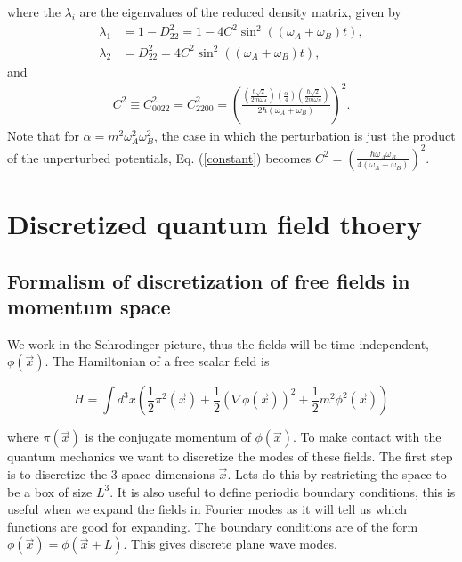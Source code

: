 \documentclass[aps,showpacs,onecolumn,floats,prd,superscriptaddress,nofootinbib]{revtex4-1}
\begin{document}
where the $\lambda_i$ are the eigenvalues of the reduced density matrix, given by
\begin{align}
\lambda_1 &= 1 - D_{22}^2 = 1 - 4C^2 \sin^2{((\omega_A + \omega_B)t)}, \label{eig1}
\\ \lambda_2 &= D_{22}^2 = 4C^2 \sin^2{((\omega_A + \omega_B)t)}, \label{eig2}
\end{align}
and 
\begin{align}
C^2 \equiv C_{0022}^2 =  C_{2200}^2 = \left(\frac{\left( \frac{\hbar\sqrt{2}}{2m\omega_A}\right) \left( \frac{\alpha}{4}\right) \left( \frac{\hbar\sqrt{2}}{2m\omega_B}\right)}{2\hbar (\omega_A + \omega_B)}\right)^2. \label{constant}
\end{align}
Note that for $\alpha = m^2 \omega_A^2\omega_B^2$, the case in which the perturbation is just the product of the unperturbed potentials, Eq. (\ref{constant}) becomes $C^2 =  \left( \frac{\hbar \omega_A\omega_B}{4(\omega_A + \omega_B)} \right)^2$. 

\section{Discretized quantum field thoery} \label{sec:QFTflat}

\subsection{Formalism of discretization of free fields in momentum space}

We work in the Schrodinger picture, thus the fields will be time-independent, $\phi(\vec{x})$. 
The Hamiltonian of a free scalar field is

\begin{equation}
	H = \int d^3x \left( \frac{1}{2} \pi^2(\vec{x}) + \frac{1}{2} (\nabla \phi(\vec{x}))^2 + \frac{1}{2} m^2 \phi^2(\vec{x}) \right)	\label{free-scalar hamiltonian}
\end{equation}

where $\pi(\vec{x})$ is the conjugate momentum of $\phi(\vec{x})$. 
To make contact with the quantum mechanics we want to discretize the modes of these fields. 
The first step is to discretize the 3 space dimensions $\vec{x}$.
Lets do this by restricting the space to be a box of size $L^3$. 
It is also useful to define periodic boundary conditions, this is useful when we expand the fields in Fourier modes as it will tell us which functions are good for expanding. 
The boundary conditions are of the form $\phi(\vec{x}) = \phi(\vec{x}  + L)$. 
This gives discrete plane wave modes. 
\end{document}
